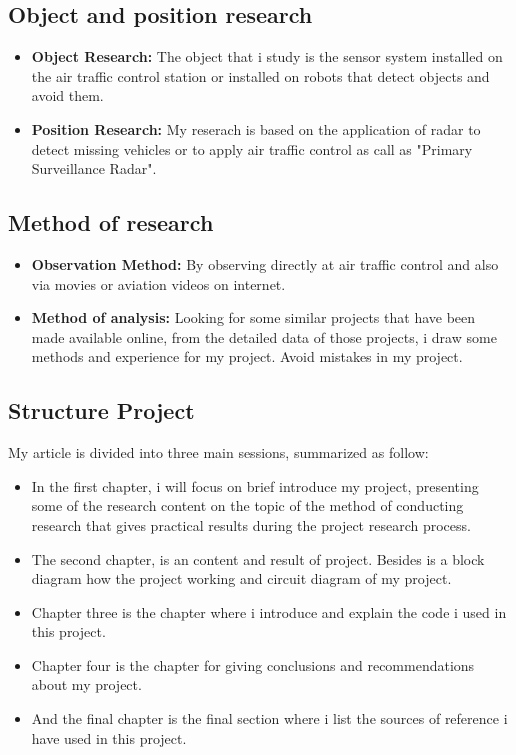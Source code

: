 \documentclass[13pt,a4paper]{report}
\begin{document}
    \subsection{Object and position research}
    \vspace{3mm}
        \begin{itemize}
            \item \textbf{Object Research:} The object that i study is the sensor system 
        installed on the air traffic control station or installed on robots that detect 
        objects and avoid them.
            \item \textbf{Position Research:} My reserach is based on the application of radar 
        to detect missing vehicles or to apply air traffic control as call as "Primary Surveillance Radar".
        \end{itemize} 
    \subsection{Method of research}
        \begin{itemize}
            \item \textbf{Observation Method:} By observing directly at air traffic control 
        and also via movies or aviation videos on internet.
            \item \textbf{Method of analysis:} Looking for some similar projects that have 
        been made available online, from the detailed data of those projects, i draw some 
        methods and experience for my project. Avoid mistakes in my project.
        \end{itemize}
    \subsection{Structure Project}
        My article is divided into three main sessions, summarized as follow: 
        \begin{itemize}
            \item In the first chapter, i will focus on brief introduce my project, presenting 
        some of the research content on the topic of the method of conducting research that 
        gives practical results during the project research process.
            \item The second chapter, is an content and result of project. Besides is a block diagram 
        how the project working and circuit diagram of my project.
            \item Chapter three is the chapter where i introduce and explain the code i used in this project.
            \item Chapter four is the chapter for giving conclusions and recommendations about my project.
            \item And the final chapter is the final section where i list the sources of reference i have 
        used in this project.
        \end{itemize}
    \newpage
\end{document}
